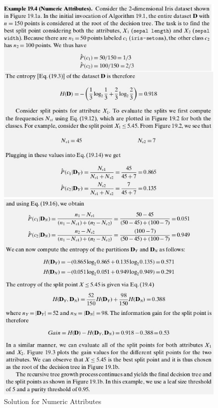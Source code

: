 \begin{figure}[H]
\centerline{\includegraphics[width=\textwidth]{Figures/dt11}}
\caption{\label{fig:figure}Solution for Numeric Attributes}
\end{figure}
